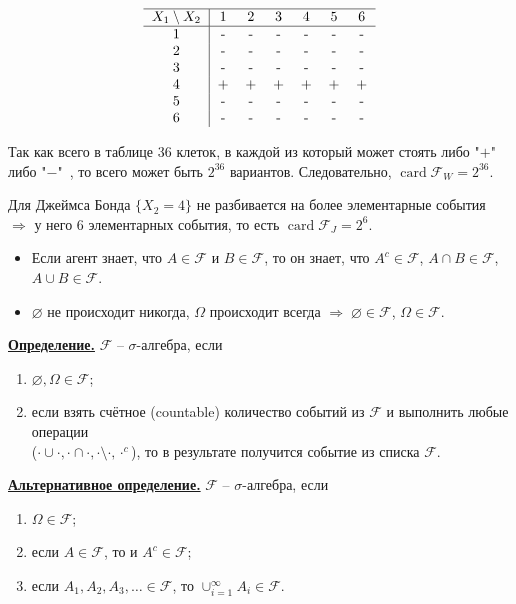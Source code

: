 \documentclass[a4paper]{article}
\DeclareMathOperator{\card}{\mathop{card}}
\begin{document}
 \[\begin{tabular}{c|cccccc}
\hline
$X_1\setminus X_2$&1&2&3&4&5&6\\
\hline
1&-&-&-&-&-&-\\
2&-&-&-&-&-&-\\
3&-&-&-&-&-&-\\
4&+&+&+&+&+&+\\
5&-&-&-&-&-&-\\
6&-&-&-&-&-&-\\
\end{tabular}\]
 \par Так как всего в таблице 36 клеток, в каждой из который может стоять либо "$+$"\, либо "$-$"\ , то всего может быть $2^{36}$ вариантов. Следовательно, $\card \mathcal{F}_W=2^{36}$.\\
 \par Для Джеймса Бонда $\{X_2=4\}$ не разбивается на более элементарные события $\Rightarrow$ у него 6 элементарных события, то есть  $\card\mathcal{F}_J=2^6$.\\
 \begin{itemize}
  \item Если агент знает, что $A\in\mathcal{F}$ и $B\in\mathcal{F}$, то он знает, что $A^c\in\mathcal{F}$, $A\cap B\in\mathcal{F}$, $A\cup B\in\mathcal{F}$.\\
 \item $\varnothing$ не происходит никогда, $\Omega$ происходит всегда $\Rightarrow\;\varnothing\in\mathcal{F}$, $\Omega\in\mathcal{F}$.
 \end{itemize}
 \par {\bf\underline{Определение.}} $\mathcal{F}$ -- $\sigma$-алгебра, если
 \begin{enumerate}
 \item $\varnothing,\Omega\in\mathcal{F}$;
 \item если взять счётное (countable) количество событий из $\mathcal{F}$ и выполнить любые операции \\($\cdot\cup\cdot,\cdot\cap\cdot,\cdot\setminus\cdot,\cdot^c$), то в результате получится событие из списка $\mathcal{F}$.
\end{enumerate}
 \par {\bf\underline{Альтернативное определение.}} $\mathcal{F}$ -- $\sigma$-алгебра, если
 \begin{enumerate}
 \item $\Omega\in\mathcal{F}$;
 \item если $A\in\mathcal{F}$, то и $A^c\in\mathcal{F}$;
 \item если $A_1,A_2,A_3,\dots\in\mathcal{F}$, то $\cup_{i=1}^{\infty}A_i\in\mathcal{F}$.\\
\end{enumerate}
\end{document}
